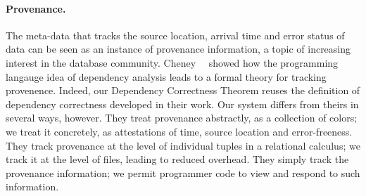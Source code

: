 



\paragraph*{Provenance.}  The \padsd{} meta-data that tracks the
source location, arrival time and error status of data can be seen as
an instance of provenance information, a topic of increasing interest
in the database community.  Cheney~\etal{}~\cite{cheney-dbpl07} showed
how the programming langauge idea of dependency analysis leads to a
formal theory for tracking provenence.  Indeed, our Dependency
Correctness Theorem reuses the definition of dependency correctness
developed in their work.  Our system differs from theirs in several
ways, however.  They treat provenance abstractly, as a collection of
colors; we treat it concretely, as attestations of time, source
location and error-freeness.  They track provenance at the level of
individual tuples in a relational calculus; we track it at the level
of files, leading to reduced overhead.  They simply track the
provenance information; we permit programmer code to view and
respond to such information.


